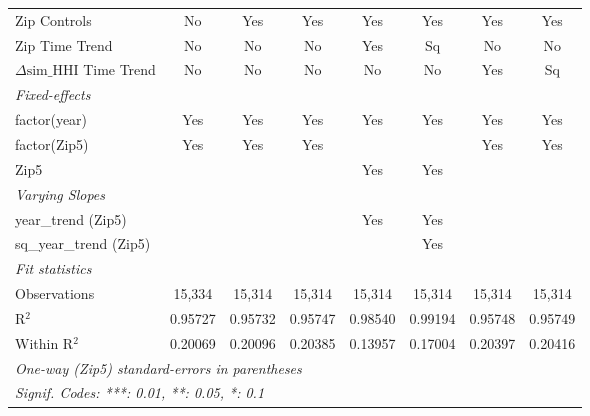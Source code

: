 \begin{table}[H]
{\begin{tabular}{lccccccc}
 Zip Controls & No & Yes & Yes & Yes & Yes & Yes & Yes\\ 

 Zip Time Trend & No & No & No & Yes & Sq & No & No\\ 

 $\Delta \text{sim\_HHI}$ Time Trend & No & No & No & No & No & Yes & Sq\\ 

 \midrule \emph{Fixed-effects}&   &   &   &   &   &   &  \\ 

 factor(year) & Yes & Yes & Yes & Yes & Yes & Yes & Yes\\ 

 factor(Zip5) & Yes & Yes & Yes &  &  & Yes & Yes\\ 

 Zip5 &  &  &  & Yes & Yes &  & \\ 

 \midrule \emph{Varying Slopes}&   &   &   &   &   &   &  \\ 

 year\_trend (Zip5) &  &  &  & Yes & Yes &  & \\ 

 sq\_year\_trend (Zip5) &  &  &  &  & Yes &  & \\ 

 \midrule \emph{Fit statistics}&  & & & & & & \\ 

 Observations & 15,334&15,314&15,314&15,314&15,314&15,314&15,314\\ 

 R$^2$ & 0.95727&0.95732&0.95747&0.98540&0.99194&0.95748&0.95749\\ 

 Within R$^2$ & 0.20069&0.20096&0.20385&0.13957&0.17004&0.20397&0.20416\\ 

 \midrule\midrule\multicolumn{8}{l}{\emph{One-way (Zip5) standard-errors in parentheses}}\\ 

 \multicolumn{8}{l}{\emph{Signif. Codes: ***: 0.01, **: 0.05, *: 0.1}}\\ 

 \end{tabular}} 

 \end{table} 

  

